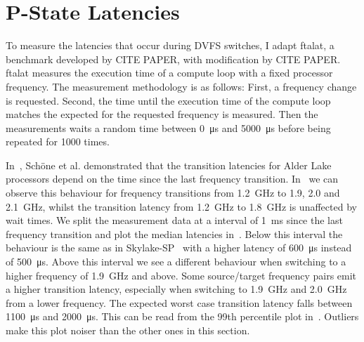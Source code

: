 

\section{P-State Latencies}


To measure the latencies that occur during DVFS switches, I adapt ftalat, a benchmark developed by CITE PAPER, with modification by CITE PAPER.
ftalat measures the execution time of a compute loop with a fixed processor frequency.
The measurement methodology is as follows:
First, a frequency change is requested.
Second, the time until the execution time of the compute loop matches the expected for the requested frequency is measured.
Then the measurements waits a random time between \SI{0}{\us} and \SI{5000}{\us} before being repeated for \SI{1000}{} times.

In~\cite{Schoene_2024_Alder_Lake}, Schöne et al. demonstrated that the transition latencies for Alder Lake processors depend on the time since the last frequency transition.
In~ we can observe this behaviour for frequency transitions from \SI{1.2}{\GHz} to \SI{1.9}{}, \SI{2.0}{} and \SI{2.1}{\GHz}, whilst the transition latency from \SI{1.2}{\GHz} to \SI{1.8}{\GHz} is unaffected by wait times.
We split the measurement data at a interval of \SI{1}{\ms} since the last frequency transition and plot the median latencies in~.
Below this interval the behaviour is the same as in Skylake-SP~\cite{Schoene_2019_SKL} with a higher latency of \SI{600}{\us} instead of \SI{500}{\us}.
Above this interval we see a different behaviour when switching to a higher frequency of \SI{1.9}{\GHz} and above.
Some source/target frequency pairs emit a higher transition latency, especially when switching to \SI{1.9}{\GHz} and \SI{2.0}{\GHz} from a lower frequency.
The expected worst case transition latency falls between \SI{1100}{\us} and \SI{2000}{\us}.
This can be read from the 99th percentile plot in~.
Outliers make this plot noiser than the other ones in this section.


